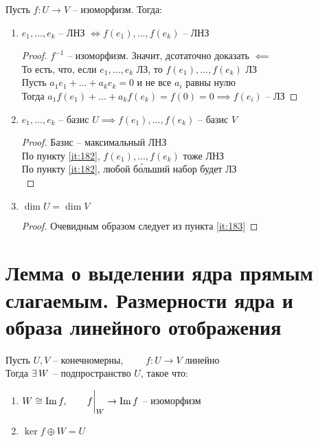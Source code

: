 \begin{properties}
	Пусть $ f : U \to V $ -- изоморфизм. Тогда:
	\begin{enumerate}
		\item \label{it:182} $ e_1, ..., e_k $ -- ЛНЗ $ \iff f(e_1), ..., f(e_k) $ -- ЛНЗ
		\begin{proof}
			$ f^{-1} $ -- изоморфизм. Значит, дсотаточно доказать $ \impliedby $ \\
			То есть, что, если $ e_1, ..., e_k $ ЛЗ, то $ f(e_1), ..., f(e_k) $ ЛЗ \\
			Пусть $ a_1e_1 + ... + a_ke_k = 0 $ и не все $ a_i $ равны нулю \\
			Тогда $ a_1f(e_1) + ... + a_kf(e_k) = f(0) = 0 \implies f(e_i) $ -- ЛЗ
		\end{proof}
		\item \label{it:183} $ e_1, ..., e_k $ -- базис $ U \implies f(e_1), ..., f(e_k) $ -- базис $ V $
		\begin{proof}
			Базис -- максимальный ЛНЗ \\
			По пункту \ref{it:182}, $ f(e_1), ..., f(e_k) $ тоже ЛНЗ \\
			По пункту \ref{it:182}, любой б\'{о}льший набор будет ЛЗ \\
		\end{proof}
		\item $ \dim U = \dim V $
		\begin{proof}
			Очевидным образом следует из пункта \ref{it:183}
		\end{proof}
	\end{enumerate}
\end{properties}

\section{Лемма о выделении ядра прямым слагаемым. Размерности ядра и образа линейного отображения}

\begin{lemma}
	Пусть $ U, V $ -- конечномерны, $ \qquad f : U \to V $ линейно \\
    Тогда $ \exists\, W $ -- подпространство $ U $, такое что:
    \begin{enumerate}
        \item $ W \cong \operatorname{Im} f, \qquad f \bigg|_{W}^{} \to \operatorname{Im} f $ -- изоморфизм
        \item $ \ker f \oplus W = U $
    \end{enumerate}
\end{lemma}

